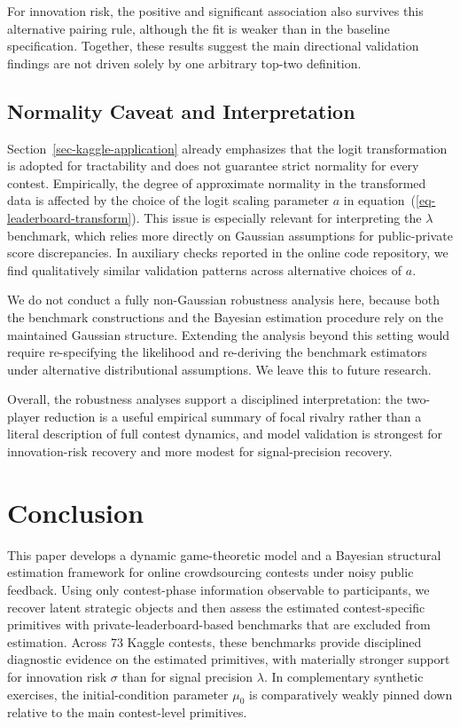 \documentclass[mnsc]{informs3}
\begin{document}
For innovation risk, the positive and significant association also survives this alternative pairing rule, although the fit is weaker than in the baseline specification.
Together, these results suggest the main directional validation findings are not driven solely by one arbitrary top-two definition.


\subsection{Normality Caveat and Interpretation}\label{sect-robust-normality}

Section~\ref{sec-kaggle-application} already emphasizes that the logit transformation is adopted for tractability and does not guarantee strict normality for every contest.
Empirically, the degree of approximate normality in the transformed data is affected by the choice of the logit scaling parameter $a$ in equation~(\ref{eq-leaderboard-transform}).
This issue is especially relevant for interpreting the $\lambda$ benchmark, which relies more directly on Gaussian assumptions for public-private score discrepancies.
In auxiliary checks reported in the online code repository, we find qualitatively similar validation patterns across alternative choices of $a$.

We do not conduct a fully non-Gaussian robustness analysis here, because both the benchmark constructions and the Bayesian estimation procedure rely on the maintained Gaussian structure.
Extending the analysis beyond this setting would require re-specifying the likelihood and re-deriving the benchmark estimators under alternative distributional assumptions.
We leave this to future research.

Overall, the robustness analyses support a disciplined interpretation: the two-player reduction is a useful empirical summary of focal rivalry rather than a literal description of full contest dynamics, and model validation is strongest for innovation-risk recovery and more modest for signal-precision recovery.


\section{Conclusion}

This paper develops a dynamic game-theoretic model and a Bayesian structural estimation framework for online crowdsourcing contests under noisy public feedback.
Using only contest-phase information observable to participants, we recover latent strategic objects and then assess the estimated contest-specific primitives with private-leaderboard-based benchmarks that are excluded from estimation.
Across 73 Kaggle contests, these benchmarks provide disciplined diagnostic evidence on the estimated primitives, with materially stronger support for innovation risk $\sigma$ than for signal precision $\lambda$.
In complementary synthetic exercises, the initial-condition parameter $\mu_0$ is comparatively weakly pinned down relative to the main contest-level primitives.
\end{document}
